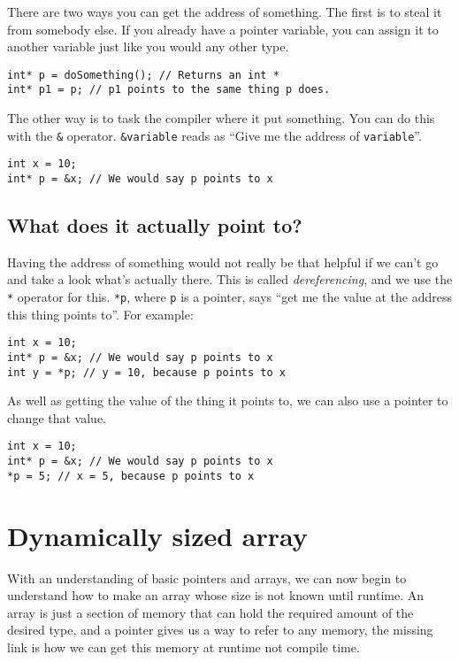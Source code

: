 There are two ways you can get the address of something.
The first is to steal it from somebody else.
If you already have a pointer variable, you can assign it to another variable just like you would any other type.

\begin{lstlisting}
int* p = doSomething(); // Returns an int *
int* p1 = p; // p1 points to the same thing p does.
\end{lstlisting}

The other way is to task the compiler where it put something.
You can do this with the \texttt{\&} operator.
\texttt{\&variable} reads as ``Give me the address of \texttt{variable}''.

\begin{lstlisting}
int x = 10;
int* p = &x; // We would say p points to x
\end{lstlisting}

\subsection{What does it actually point to?}

Having the address of something would not really be that helpful if we can't go and take a look what's actually there.
This is called \emph{dereferencing}, and we use the \texttt{*} operator for this.
\texttt{*p}, where \texttt{p} is a pointer, says ``get me the value at the address this thing points to''.
For example:

\begin{lstlisting}
int x = 10;
int* p = &x; // We would say p points to x
int y = *p; // y = 10, because p points to x
\end{lstlisting}

As well as getting the value of the thing it points to, we can also use a pointer to change that value.

\begin{lstlisting}
int x = 10;
int* p = &x; // We would say p points to x
*p = 5; // x = 5, because p points to x
\end{lstlisting}

\section{Dynamically sized array}

With an understanding of basic pointers and arrays, we can now begin to understand how to make an array whose size is not known until runtime.
An array is just a section of memory that can hold the required amount of the desired type, and a pointer gives us a way to refer to any memory, the missing link is how we can get this memory at runtime not compile time.

